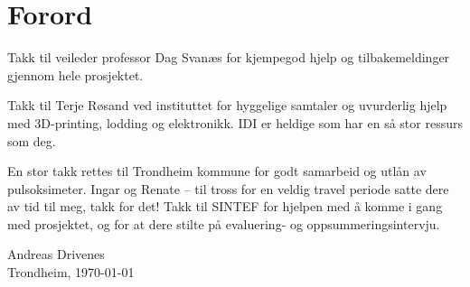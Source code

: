 \chapter*{Forord}
Takk til veileder professor Dag Svanæs for kjempegod hjelp og tilbakemeldinger gjennom hele prosjektet.

Takk til Terje Røsand ved instituttet for hyggelige samtaler og uvurderlig hjelp med 3D-printing, lodding og elektronikk.
IDI er heldige som har en så stor ressurs som deg.

En stor takk rettes til Trondheim kommune for godt samarbeid og utlån av pulsoksimeter.
Ingar og Renate -- til tross for en veldig travel periode satte dere av tid til meg, takk for det!
Takk til SINTEF for hjelpen med å komme i gang med prosjektet, og for at dere
stilte på evaluering- og oppsummeringsintervju.

\begin{flushright}
Andreas Drivenes\\[0.8pc]
Trondheim, \today
\end{flushright}

\cleardoublepage

